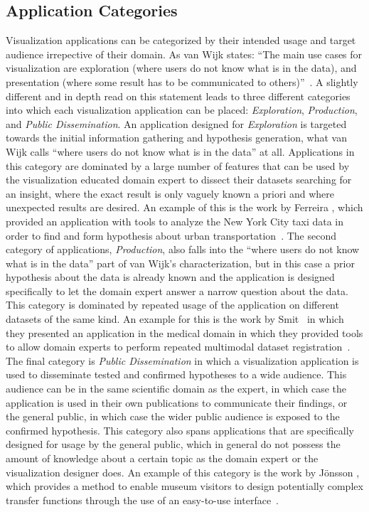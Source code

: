 \subsection{Application Categories} \label{cha:intro:appl:categories}
Visualization applications can be categorized by their intended usage and target audience irrepective of their domain. As van Wijk states: ``The main use cases for visualization are exploration (where users do not know what is in the data), and presentation (where some result has to be communicated to others)''~\cite{van2005value}.  A slightly different and in depth read on this statement leads to three different categories into which each visualization application can be placed: \emph{Exploration}, \emph{Production}, and \emph{Public Dissemination}.  An application designed for \emph{Exploration} is targeted towards the initial information gathering and hypothesis generation, what van Wijk calls ``where users do not know what is in the data'' at all.  Applications in this category are dominated by a large number of features that can be used by the visualization educated domain expert to dissect their datasets searching for an insight, where the exact result is only vaguely known a priori and where unexpected results are desired.  An example of this is the work by Ferreira \etal , which provided an application with tools to analyze the New York City taxi data in order to find and form hypothesis about urban transportation~\cite{ferreira2013visual}.  The second category of applications, \emph{Production}, also falls into the ``where users do not know what is in the data'' part of van Wijk's characterization, but in this case a prior hypothesis about the data is already known and the application is designed specifically to let the domain expert answer a narrow question about the data.  This category is dominated by repeated usage of the application on different datasets of the same kind.  An example for this is the work by Smit \etal\ in which they presented an application in the medical domain in which they provided tools to allow domain experts to perform repeated multimodal dataset registration~\cite{smit14registrationshop}.  The final category is \emph{Public Dissemination} in which a visualization application is used to disseminate tested and confirmed hypotheses to a wide audience.  This audience can be in the same scientific domain as the expert, in which case the application is used in their own publications to communicate their findings, or the general public, in which case the wider public audience is exposed to the confirmed hypothesis.  This category also spans applications that are specifically designed for usage by the general public, which in general do not possess the amount of knowledge about a certain topic as the domain expert or the visualization designer does.  An example of this category is the work by J\"onsson \etal , which provides a method to enable museum visitors to design potentially complex transfer functions through the use of an easy-to-use interface~\cite{jonsson2016intuitive}.


